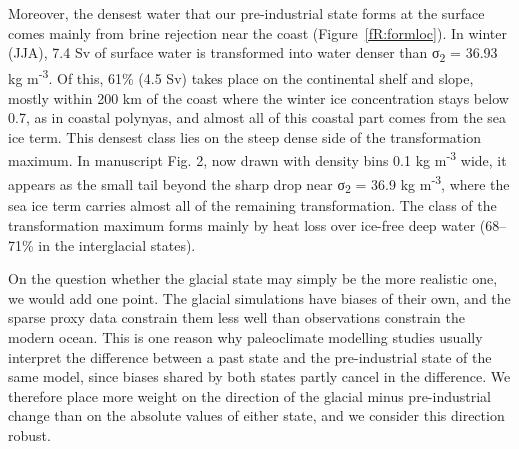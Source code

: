 \documentclass[11pt,a4paper]{article}
\begin{document}
Moreover, the densest water that our pre-industrial state forms at the surface comes mainly from brine rejection near the coast (Figure~\ref{fR:formloc}). In winter (JJA), 7.4 Sv of surface water is transformed into water denser than σ\textsubscript{2} = 36.93 kg m\textsuperscript{-3}. Of this, 61\% (4.5 Sv) takes place on the continental shelf and slope, mostly within 200 km of the coast where the winter ice concentration stays below 0.7, as in coastal polynyas, and almost all of this coastal part comes from the sea ice term. This densest class lies on the steep dense side of the transformation maximum. In manuscript Fig. 2, now drawn with density bins 0.1 kg m\textsuperscript{-3} wide, it appears as the small tail beyond the sharp drop near σ\textsubscript{2} = 36.9 kg m\textsuperscript{-3}, where the sea ice term carries almost all of the remaining transformation.
The class of the transformation maximum forms mainly by heat loss over ice-free deep water (68--71\% in the interglacial states). 

On the question whether the glacial state may simply be the more realistic one, we would add one point. The glacial simulations have biases of their own, and the sparse proxy data constrain them less well than observations constrain the modern ocean. This is one reason why paleoclimate modelling studies usually interpret the difference between a past state and the pre-industrial state of the same model, since biases shared by both states partly cancel in the difference. We therefore place more weight on the direction of the glacial minus pre-industrial change than on the absolute values of either state, and we consider this direction robust.
\end{document}
